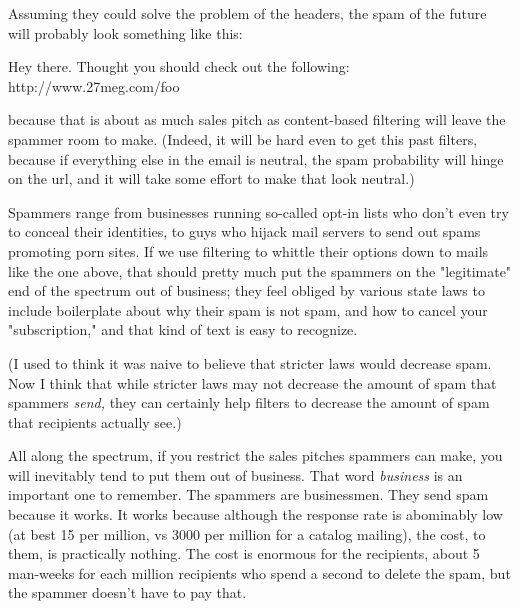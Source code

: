 Assuming they could solve the problem
                    of the headers, the spam of the future will probably look
                    something like this:
                    
                      
Hey there.  Thought you should check out the following:
http://www.27meg.com/foo

                    
                    because that is about as much sales pitch as content-based
                    filtering will leave the spammer room to make. (Indeed, it
                    will be hard even to get this past filters, because if
                    everything else in the email is neutral, the spam
                    probability will hinge on the url, and it will take some
                    effort to make that look neutral.)

Spammers range
                    from businesses running so-called opt-in lists who don't
                    even try to conceal their identities, to guys who hijack
                    mail servers to send out spams promoting porn sites. If we
                    use filtering to whittle their options down to mails like
                    the one above, that should pretty much put the spammers on
                    the "legitimate" end of the spectrum out of business; they
                    feel obliged by various state laws to include boilerplate
                    about why their spam is not spam, and how to cancel your
                    "subscription," and that kind of text is easy to
                    recognize.

(I used to think it was naive to
                    believe that stricter laws would decrease spam. Now I think
                    that while stricter laws may not decrease the amount of spam
                    that spammers \emph{send,} they can certainly help filters
                    to decrease the amount of spam that recipients actually
                    see.)

All along the spectrum, if you restrict the
                    sales pitches spammers can make, you will inevitably tend to
                    put them out of business. That word \emph{business} is an
                    important one to remember. The spammers are businessmen.
                    They send spam because it works. It works because although
                    the response rate is abominably low (at best 15 per million,
                    vs 3000 per million for a catalog mailing), the cost, to
                    them, is practically nothing. The cost is enormous for the
                    recipients, about 5 man-weeks for each million recipients
                    who spend a second to delete the spam, but the spammer
                    doesn't have to pay that.

